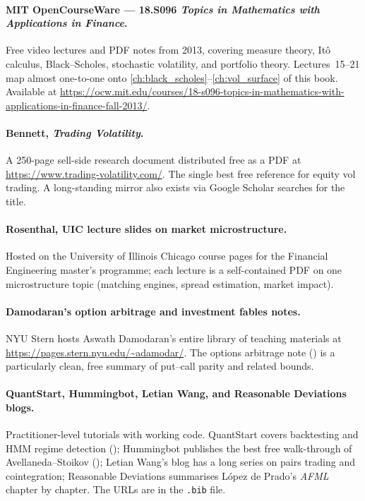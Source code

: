 \paragraph{MIT OpenCourseWare --- 18.S096 \emph{Topics in Mathematics
with Applications in Finance}.} Free video lectures and PDF notes from
2013, covering measure theory, It\^o calculus, Black--Scholes,
stochastic volatility, and portfolio theory. Lectures~15--21 map
almost one-to-one onto \cref{ch:black_scholes}--\cref{ch:vol_surface}
of this book. Available at \url{https://ocw.mit.edu/courses/18-s096-topics-in-mathematics-with-applications-in-finance-fall-2013/}.

\paragraph{Bennett, \emph{Trading Volatility}.} A 250-page sell-side
research document distributed free as a PDF at
\url{https://www.trading-volatility.com/}. The single best free
reference for equity vol trading. A long-standing mirror also exists
via Google Scholar searches for the title.

\paragraph{Rosenthal, UIC lecture slides on market microstructure.}
Hosted on the University of Illinois Chicago course pages for the
Financial Engineering master's programme; each lecture is a
self-contained PDF on one microstructure topic (matching engines,
spread estimation, market impact).

\paragraph{Damodaran's option arbitrage and investment fables notes.}
NYU Stern hosts Aswath Damodaran's entire library of teaching
materials at \url{https://pages.stern.nyu.edu/~adamodar/}. The
options arbitrage note (\citealp{damodaranOptionsArbitrage}) is a
particularly clean, free summary of put--call parity and related
bounds.

\paragraph{QuantStart, Hummingbot, Letian Wang, and Reasonable
Deviations blogs.} Practitioner-level tutorials with working code.
QuantStart covers backtesting and HMM regime detection
(\citealp{quantstart2016hmm}); Hummingbot publishes the best free
walk-through of Avellaneda--Stoikov (\citealp{hummingbotASguide});
Letian Wang's blog has a long series on pairs trading and cointegration;
Reasonable Deviations summarises L\'opez de Prado's \emph{AFML}
chapter by chapter. The URLs are in the \texttt{.bib} file.

